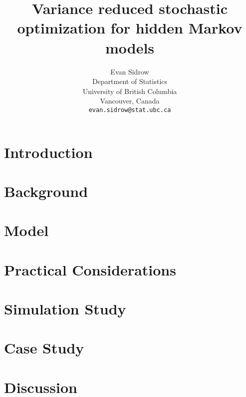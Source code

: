\documentclass{article}
\title{Variance reduced stochastic optimization for hidden Markov models}
\author{
  Evan Sidrow \\
  Department of Statistics\\
  University of British Columbia\\
  Vancouver, Canada \\
  \texttt{evan.sidrow@stat.ubc.ca} \\
}
\begin{document}
\maketitle


\section{Introduction}


\section{Background}


\section{Model}


\section{Practical Considerations}

\label{sec:prac}

\section{Simulation Study}


\section{Case Study}


\section{Discussion}


\newpage


\end{document}
